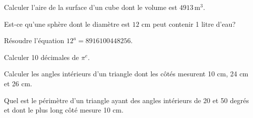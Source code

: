 \begin{exercice}
    Calculer l'aire de la surface d'un cube dont le volume est 
    $4913\,\mathrm{m}^3$.
\end{exercice}

\begin{exercice}
    Est-ce qu'une sphère dont le diamètre est $12$ cm peut contenir 1 litre
    d'eau?
\end{exercice}

\begin{exercice}
Résoudre l'équation $12^a=8916100448256$.
\end{exercice}

\begin{exercice}
Calculer 10 décimales de $\pi^e$.
\end{exercice}

\begin{exercice}
    Calculer les angles intérieurs d'un triangle dont les côtés
    mesurent 10 cm, 24 cm et 26 cm.
\end{exercice}

\begin{exercice}
    Quel est le périmètre d'un triangle ayant des angles intérieurs de 20 et
    50 degrés et dont le plus long côté mesure 10 cm.
\end{exercice}



